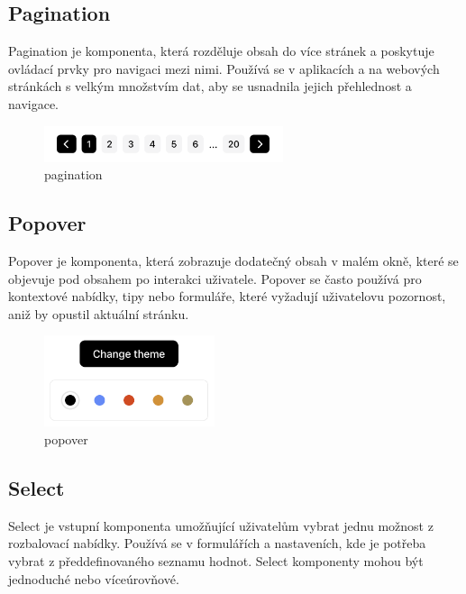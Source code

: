 \subsection{Pagination}
Pagination je komponenta, která rozděluje obsah do více stránek a poskytuje ovládací prvky pro navigaci mezi nimi. Používá se v aplikacích a na webových stránkách s velkým množstvím dat, aby se usnadnila jejich přehlednost a navigace.

\begin{figure}[H]
  \centering
  \includegraphics[width=7cm]{images/pagination}
  \captionsetup{justification=centering,margin=2cm}
  \caption{pagination} \label{picture:pagination}
\end{figure}

\subsection{Popover}
Popover je komponenta, která zobrazuje dodatečný obsah v malém okně, které se objevuje pod obsahem po interakci uživatele. Popover se často používá pro kontextové nabídky, tipy nebo formuláře, které vyžadují uživatelovu pozornost, aniž by opustil aktuální stránku.

\begin{figure}[H]
  \centering
  \includegraphics[width=5cm]{images/popover}
  \captionsetup{justification=centering,margin=2cm}
  \caption{popover} \label{picture:popover}
\end{figure}

\subsection{Select}
Select je vstupní komponenta umožňující uživatelům vybrat jednu možnost z rozbalovací nabídky. Používá se v formulářích a nastaveních, kde je potřeba vybrat z předdefinovaného seznamu hodnot. Select komponenty mohou být jednoduché nebo víceúrovňové.

